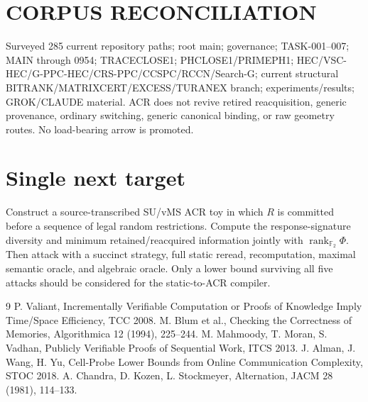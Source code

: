 \documentclass[11pt]{article}
\begin{document}
\section*{CORPUS RECONCILIATION}
Surveyed 285 current repository paths; root main; governance; TASK-001--007; MAIN through 0954; TRACECLOSE1; PHCLOSE1/PRIMEPH1; HEC/VSC-HEC/G-PPC-HEC/CRS-PPC/CCSPC/RCCN/Search-G; current structural BITRANK/MATRIXCERT/EXCESS/TURANEX branch; experiments/results; GROK/CLAUDE material. ACR does not revive retired reacquisition, generic provenance, ordinary switching, generic canonical binding, or raw geometry routes. No load-bearing arrow is promoted.

\section*{Single next target}
Construct a source-transcribed SU/vMS ACR toy in which $R$ is committed before a sequence of legal random restrictions. Compute the response-signature diversity and minimum retained/reacquired information jointly with $\operatorname{rank}_{\mathbb F_2}\Phi$. Then attack with a succinct strategy, full static reread, recomputation, maximal semantic oracle, and algebraic oracle. Only a lower bound surviving all five attacks should be considered for the static-to-ACR compiler.

\begin{thebibliography}{9}
 P. Valiant, Incrementally Verifiable Computation or Proofs of Knowledge Imply Time/Space Efficiency, TCC 2008.
 M. Blum et al., Checking the Correctness of Memories, Algorithmica 12 (1994), 225--244.
 M. Mahmoody, T. Moran, S. Vadhan, Publicly Verifiable Proofs of Sequential Work, ITCS 2013.
 J. Alman, J. Wang, H. Yu, Cell-Probe Lower Bounds from Online Communication Complexity, STOC 2018.
 A. Chandra, D. Kozen, L. Stockmeyer, Alternation, JACM 28 (1981), 114--133.
\end{thebibliography}
\end{document}
